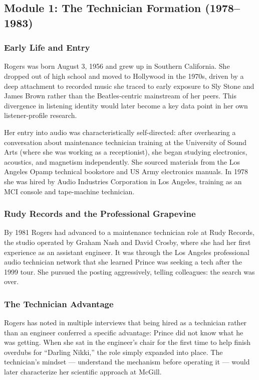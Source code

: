 \documentclass[11pt,letterpaper]{article}
\begin{document}
\subsection{Module 1: The Technician Formation (1978--1983)}

\subsubsection{Early Life and Entry}

Rogers was born August 3, 1956 and grew up in Southern California. She dropped out of high school and moved to Hollywood in the 1970s, driven by a deep attachment to recorded music she traced to early exposure to Sly Stone and James Brown rather than the Beatles-centric mainstream of her peers. This divergence in listening identity would later become a key data point in her own listener-profile research.

Her entry into audio was characteristically self-directed: after overhearing a conversation about maintenance technician training at the University of Sound Arts (where she was working as a receptionist), she began studying electronics, acoustics, and magnetism independently. She sourced materials from the Los Angeles Opamp technical bookstore and US Army electronics manuals. In 1978 she was hired by Audio Industries Corporation in Los Angeles, training as an MCI console and tape-machine technician.

\subsubsection{Rudy Records and the Professional Grapevine}

By 1981 Rogers had advanced to a maintenance technician role at Rudy Records, the studio operated by Graham Nash and David Crosby, where she had her first experience as an assistant engineer. It was through the Los Angeles professional audio technician network that she learned Prince was seeking a tech after the 1999 tour. She pursued the posting aggressively, telling colleagues: the search was over.

\subsubsection{The Technician Advantage}

Rogers has noted in multiple interviews that being hired as a technician rather than an engineer conferred a specific advantage: Prince did not know what he was getting. When she sat in the engineer's chair for the first time to help finish overdubs for ``Darling Nikki,'' the role simply expanded into place. The technician's mindset --- understand the mechanism before operating it --- would later characterize her scientific approach at McGill.
\end{document}
